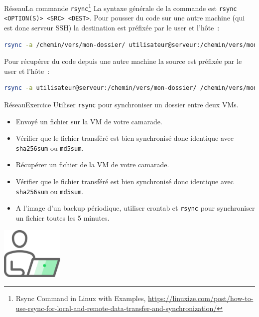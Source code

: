 \documentclass{beamer}
\begin{document}
    \begin{frame}[fragile]{Réseau}{La commande \lstinline{rsync}\footnote{Rsync Command in Linux with Examples, \url{https://linuxize.com/post/how-to-use-rsync-for-local-and-remote-data-transfer-and-synchronization/}}}
        La syntaxe générale de la commande est \lstinline{rsync <OPTION(S)> <SRC> <DEST>}.
        Pour pousser du code sur une autre machine (qui est donc serveur SSH) la destination est préfixée par le user et l'hôte~:
        \bigbreak
        \begin{lstlisting}[language=bash]
rsync -a /chemin/vers/mon-dossier/ utilisateur@serveur:/chemin/vers/mon-dossier/
        \end{lstlisting}
        Pour récupérer du code depuis une autre machine la source est préfixée par le user et l'hôte~:
        \begin{lstlisting}[language=bash]
rsync -a utilisateur@serveur:/chemin/vers/mon-dossier/ /chemin/vers/mon-dossier/
        \end{lstlisting}
    \end{frame}
    \begin{frame}{Réseau}{Exercice \execcounterdispinc}
        Utiliser \lstinline{rsync} pour synchroniser un dossier entre deux VMs.
        \begin{itemize}
            \item Envoyé un fichier sur la VM de votre camarade.
            \item Vérifier que le fichier transféré est bien synchronisé donc identique avec \lstinline{sha256sum} ou \lstinline{md5sum}.
            \item Récupérer un fichier de la VM de votre camarade.
            \item Vérifier que le fichier transféré est bien synchronisé donc identique avec \lstinline{sha256sum} ou \lstinline{md5sum}.
            \item A l'image d'un backup périodique, utiliser crontab et \lstinline{rsync} pour synchroniser un fichier toutes les 5 minutes.
        \end{itemize}
        \begin{center}
            \includegraphics[width=3cm]{image/guy-in-front-of-desktop}
        \end{center}
    \end{frame}
\end{document}
